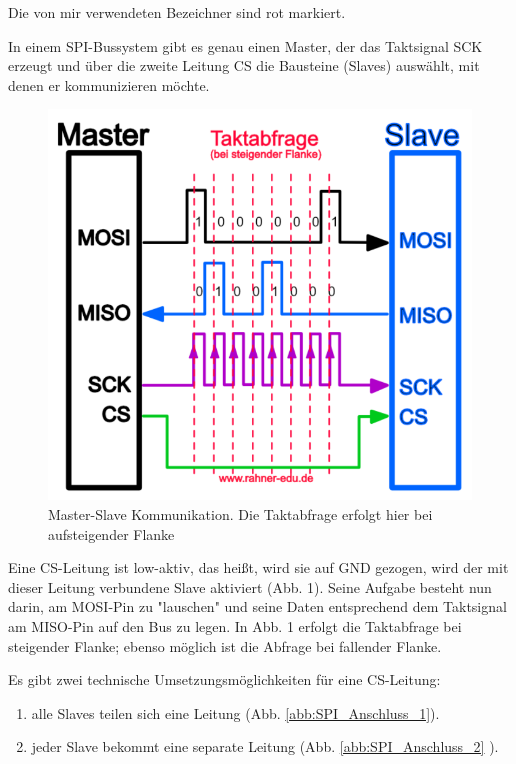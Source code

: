 Die von mir verwendeten Bezeichner sind rot markiert.

In einem SPI-Bussystem gibt es genau einen Master, der das Taktsignal SCK erzeugt und über die zweite Leitung CS die Bausteine (Slaves) auswählt, mit denen er kommunizieren möchte.



\begin{figure}[H]
	\begin{center}
		\includegraphics[scale=0.4]{figures/hcis/spi_taktabfrage.png}
		\caption{Master-Slave Kommunikation. Die Taktabfrage erfolgt hier bei aufsteigender Flanke}
		\label{abb:Taktabfrage}
	\end{center}
\end{figure}

Eine CS-Leitung ist low-aktiv, das heißt, wird sie auf GND gezogen, wird der mit dieser Leitung verbundene Slave aktiviert (Abb. 1). Seine Aufgabe besteht nun darin, am MOSI-Pin zu "lauschen" und seine Daten entsprechend dem Taktsignal am MISO-Pin auf den Bus zu legen. In Abb. 1 erfolgt die Taktabfrage bei steigender Flanke; ebenso möglich ist die Abfrage bei fallender Flanke.

Es gibt zwei technische Umsetzungsmöglichkeiten für eine CS-Leitung:

\begin{enumerate}
	\item alle Slaves teilen sich eine Leitung (Abb. \ref{abb:SPI_Anschluss_1}).
	\item jeder Slave bekommt eine separate Leitung (Abb. \ref{abb:SPI_Anschluss_2} ).
\end{enumerate}

